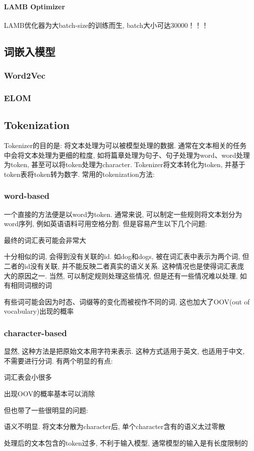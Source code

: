 \paragraph{LAMB Optimizer}
LAMB优化器为大batch-size的训练而生, batch大小可达30000！！！


\subsection{词嵌入模型}
\subsubsection{Word2Vec}

\subsubsection{ELOM}

\subsection{Tokenization}
Tokenizer的目的是: 将文本处理为可以被模型处理的数据. 通常在文本相关的任务中会将文本处理为更细的粒度, 如将篇章处理为句子、句子处理为word、word处理为token, 甚至可以将token处理为character. Tokenizer将文本转化为token, 并基于token表将token转为数字. 常用的tokenization方法: 
\subsubsection{word-based}
一个直接的方法便是以word为token. 通常来说, 可以制定一些规则将文本划分为word序列, 例如英语语料可用空格分割. 但是容易产生以下几个问题: 
\begin{myitemize}
	\item 最终的词汇表可能会非常大
	\item 十分相似的词, 会得到没有关联的id. 如dog和dogs, 被在词汇表中表示为两个词, 但二者的id没有关联, 并不能反映二者真实的语义关系. 这种情况也是使得词汇表庞大的原因之一. 当然, 可以制定规则处理这些情况, 但是还有一些情况难以处理, 如有相同词根的词
	\item 有些词可能会因为时态、词缀等的变化而被视作不同的词, 这也加大了OOV(out of vocabulary)出现的概率	
\end{myitemize}

\subsubsection{character-based}
显然, 这种方法是把原始文本用字符来表示. 这种方式适用于英文, 也适用于中文, 不需要进行分词. 有两个明显的有点: 
\begin{myitemize}
	\item 词汇表会小很多
	\item 出现OOV的概率基本可以消除
\end{myitemize}
但也带了一些很明显的问题: 
\begin{myitemize}
	\item 语义不明显. 将文本分散为character后, 单个character含有的语义太过零散
	\item 处理后的文本包含的token过多, 不利于输入模型, 通常模型的输入是有长度限制的
\end{myitemize}

